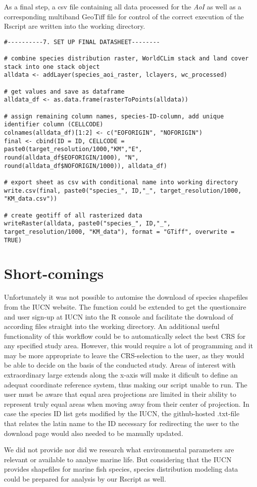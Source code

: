 \documentclass[11pt, a4paper]{article}\usepackage[]{graphicx}\usepackage[]{color}
\begin{document}
As a final step, a csv file containing all data processed for the \textit{AoI} as well as a corresponding multiband GeoTiff file for control of the correct execution of the Rscript are written into the working directory.

\begin{verbatim}
#----------7. SET UP FINAL DATASHEET--------

# combine species distribution raster, WorldCLim stack and land cover stack into one stack object
alldata <- addLayer(species_aoi_raster, lclayers, wc_processed)

# get values and save as dataframe
alldata_df <- as.data.frame(rasterToPoints(alldata))

# assign remaining column names, species-ID-column, add unique identifier column (CELLCODE)
colnames(alldata_df)[1:2] <- c("EOFORIGIN", "NOFORIGIN")
final <- cbind(ID = ID, CELLCODE = paste0(target_resolution/1000,"KM","E", round(alldata_df$EOFORIGIN/1000), "N", round(alldata_df$NOFORIGIN/1000)), alldata_df)

# export sheet as csv with conditional name into working directory
write.csv(final, paste0("species_", ID,"_", target_resolution/1000, "KM_data.csv"))

# create geotiff of all rasterized data
writeRaster(alldata, paste0("species_", ID,"_", target_resolution/1000, "KM_data"), format = "GTiff", overwrite = TRUE)
\end{verbatim}

\section{Short-comings}%

Unfortunately it was not possible to automise the download of species shapefiles from the IUCN website. The function could be extended to get the questionaire and user sign-up at IUCN into the R console and facilitate the download of according files straight into the working directory. An additional useful functionality of this workflow could be to automatically select the best CRS for any specified study area. However, this would require a lot of programming and it may be more appropriate to leave the CRS-selection to the user, as they would be able to decide on the basis of the conducted study. Areas of interest with extraordinary large extends along the x-axis will make it dificult to define an adequat coordinate reference system, thus making our script unable to run. The user must be aware that equal area projections are limited in their ability to represent truly equal areas when moving away from their center of projection. In case the species ID list gets modified by the IUCN, the github-hosted .txt-file that relates the latin name to the ID necessary for redirecting the user to the download page would also needed to be manually updated. \newline

We did not provide nor did we research what environmental parameters are relevant or available to analyse marine life. But considering that the IUCN provides shapefiles for marine fish species, species distribution modeling data could be prepared for analysis by our Rscript as well.
\end{document}
